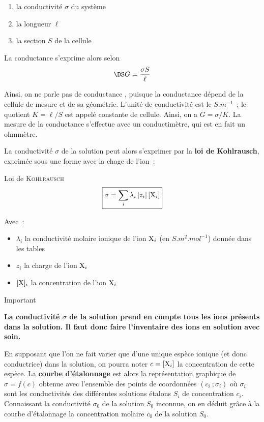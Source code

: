 \documentclass[a4paper, 11pt, final, garamond]{book}
\begin{document}
\begin{enumerate}
    \item la conductivité $\sigma$ du système
    \item la longueur $\ell$
    \item la section $S$ de la cellule
\end{enumerate}

La conductance s'exprime alors selon
\[\DS G = \frac{\sigma S}{\ell}\]

Ainsi, on ne parle pas de conductance , puisque la
conductance dépend de la cellule de mesure et de sa géométrie. L'unité de
conductivité est le $\si{S.m^{-1}}$~; le quotient $K = \ell / S$ est appelé
constante de cellule. Ainsi, on a $G = \sigma / K$. La mesure de la conductance
s'effectue avec un conductimètre, qui est en fait un ohmmètre.\bigbreak

La conductivité $\sigma$ de la solution peut alors s'exprimer par la \textbf{loi
de Kohlrausch}, exprimée sous une forme avec la chage de l'ion~:
\begin{rprop}{Loi de \textsc{Kohlrausch}}
    \[\boxed{\sigma = \sum_{i} \lambda_i \left|z_i\right| [{\rm X}_i]}\]

    Avec~:
    \begin{itemize}
        \item $\lambda_i$ la conductivité molaire ionique de l'ion ${\rm X}_i$ (en
            $\si{S.m^2.mol^{-1}}$) donnée dans les tables
        \item $z_i$ la charge de l'ion ${\rm X}_i$
        \item $[{\rm X}]_i$ la concentration de l'ion ${\rm X}_i$
    \end{itemize}
\end{rprop}

\begin{rror}{Important}
    \begin{center}
        \bfseries
        La conductivité $\sigma$ de la solution prend en compte tous les ions
        présents dans la solution. Il faut donc faire l'inventaire des ions en
        solution avec soin.
    \end{center}
\end{rror}

En supposant que l'on ne fait varier que d'une unique espèce ionique (et donc
conductrice) dans la solution, on pourra noter $c = [{\rm X}_i]$ la concentration de cette espèce.
La \textbf{courbe d'étalonnage} est alors la représentation graphique de $\sigma = f(c)$ obtenue avec l'ensemble des points de coordonnées $(c_i~; \sigma_i)$ où $\sigma_i$ sont les conductivités des différentes solutions étalons $S_i$ de concentration $c_i$. Connaissant la conductivité $\sigma_0$ de la solution $S_0$ inconnue, on en déduit grâce à la courbe d'étalonnage la concentration molaire $c_0$ de la solution $S_0$.
\end{document}
